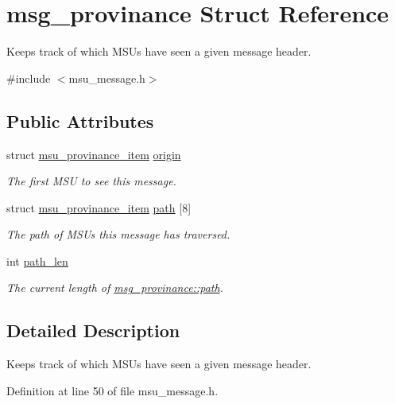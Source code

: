 \hypertarget{structmsg__provinance}{\section{msg\-\_\-provinance Struct Reference}
\label{structmsg__provinance}
}


Keeps track of which M\-S\-Us have seen a given message header.  




{\ttfamily \#include $<$msu\-\_\-message.\-h$>$}

\subsection*{Public Attributes}
\begin{DoxyCompactItemize}
\item 
struct \hyperlink{structmsu__provinance__item}{msu\-\_\-provinance\-\_\-item} \hyperlink{structmsg__provinance_a974d9fb93121e018c61b38d884b11976}{origin}
\begin{DoxyCompactList}\small\item\em The first M\-S\-U to see this message. \end{DoxyCompactList}\item 
struct \hyperlink{structmsu__provinance__item}{msu\-\_\-provinance\-\_\-item} \hyperlink{structmsg__provinance_a34afbc25ce0a338c85a16c9c2cc313db}{path} \mbox{[}8\mbox{]}
\begin{DoxyCompactList}\small\item\em The path of M\-S\-Us this message has traversed. \end{DoxyCompactList}\item 
int \hyperlink{structmsg__provinance_af76b2286a3dd70ce44114aff1b3684a0}{path\-\_\-len}
\begin{DoxyCompactList}\small\item\em The current length of \hyperlink{structmsg__provinance_a34afbc25ce0a338c85a16c9c2cc313db}{msg\-\_\-provinance\-::path}. \end{DoxyCompactList}\end{DoxyCompactItemize}


\subsection{Detailed Description}
Keeps track of which M\-S\-Us have seen a given message header. 

Definition at line 50 of file msu\-\_\-message.\-h.



